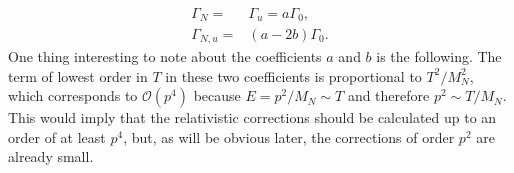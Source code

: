 \begin{align}
	\Gamma_N=&\Gamma_u=a\Gamma_0,\\
	\Gamma_{N,u}=&(a-2b)\Gamma_0.
\end{align}
One thing interesting to note about the coefficients $a$ and $b$ is the following. The term of lowest order in $T$ in these two coefficients is proportional to $T^2/M_N^2$, which corresponds to $\mathcal{O}(p^4)$ because $E=p^2/M_N\sim T$ and therefore $p^2\sim T/M_N$. This would imply that the relativistic corrections should be calculated up to an order of at least $p^4$, but, as will be obvious later, the corrections of order $p^2$ are already small.
